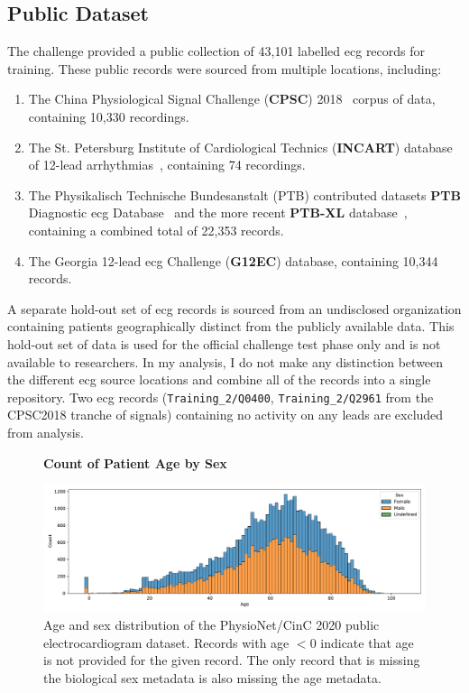 \documentclass[\main/thesis.tex]{subfiles}
\begin{document}
\subsection{Public Dataset}
The challenge provided a public collection of 43,101 labelled \gls{ecg} records for training.
These public records were sourced from multiple locations, including:

\begin{enumerate}
    \item The China Physiological Signal Challenge (\textbf{CPSC}) 2018~\cite{liu_open_2018} corpus of data, containing 10,330 recordings.
    \item The St. Petersburg Institute of Cardiological Technics (\textbf{INCART}) database of 12-lead arrhythmias~\cite{tihonenko2008st}, containing 74 recordings.
    \item The Physikalisch Technische Bundesanstalt (PTB) contributed datasets \textbf{PTB} Diagnostic \gls{ecg} Database~\cite{NutzungderEKGSignaldatenbankCARDIODATderPTBberdasInternet} and the more recent \textbf{PTB-XL} database~\cite{wagner_ptb-xl_2020}, containing a combined total of 22,353 records.
    \item The Georgia 12-lead \gls{ecg} Challenge (\textbf{G12EC}) database, containing 10,344 records.
\end{enumerate}

A separate hold-out set of \gls{ecg} records is sourced from an undisclosed organization containing patients geographically distinct from the publicly available data.
This hold-out set of data is used for the official challenge test phase only and is not available to researchers.
In my analysis, I do not make any distinction between the different \gls{ecg} source locations and combine all of the records into a single repository.
Two \gls{ecg} records (\texttt{Training\_2/Q0400}, \texttt{Training\_2/Q2961} from the CPSC2018 tranche of signals) containing no activity on any leads are excluded from analysis.

\begin{figure}[ht]
    \centering
    \textbf{Count of Patient Age by Sex}\par\medskip
    \includegraphics[width=14cm]{figure/age_sex_hist.pdf}
    \caption[Age and sex distribution of the PhysioNet/CinC 2020 public electrocardiogram dataset.]{Age and sex distribution of the PhysioNet/CinC 2020 public electrocardiogram dataset.
    Records with age $<0$ indicate that age is not provided for the given record. The only record that is missing the biological sex metadata is also missing the age metadata.}
    \label{fig:age_sex_hist}
\end{figure}
\end{document}
